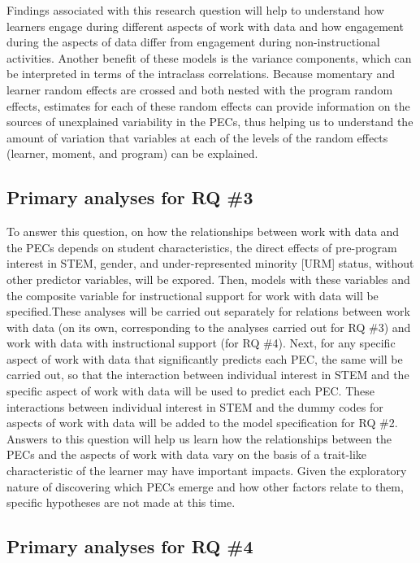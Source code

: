 \documentclass[]{msu-thesis}
\theoremstyle{definition}
\theoremstyle{definition}
\theoremstyle{definition}
\theoremstyle{remark}
\begin{document}
Findings associated with this research question will help to understand
how learners engage during different aspects of work with data and how
engagement during the aspects of data differ from engagement during
non-instructional activities. Another benefit of these models is the
variance components, which can be interpreted in terms of the intraclass
correlations. Because momentary and learner random effects are crossed
and both nested with the program random effects, estimates for each of
these random effects can provide information on the sources of
unexplained variability in the PECs, thus helping us to understand the
amount of variation that variables at each of the levels of the random
effects (learner, moment, and program) can be explained.

\subsection{Primary analyses for RQ
\#3}\label{primary-analyses-for-rq-3}

To answer this question, on how the relationships between work with data
and the PECs depends on student characteristics, the direct effects of
pre-program interest in STEM, gender, and under-represented minority
{[}URM{]} status, without other predictor variables, will be expored.
Then, models with these variables and the composite variable for
instructional support for work with data will be specified.These
analyses will be carried out separately for relations between work with
data (on its own, corresponding to the analyses carried out for RQ \#3)
and work with data with instructional support (for RQ \#4). Next, for
any specific aspect of work with data that significantly predicts each
PEC, the same will be carried out, so that the interaction between
individual interest in STEM and the specific aspect of work with data
will be used to predict each PEC. These interactions between individual
interest in STEM and the dummy codes for aspects of work with data will
be added to the model specification for RQ \#2. Answers to this question
will help us learn how the relationships between the PECs and the
aspects of work with data vary on the basis of a trait-like
characteristic of the learner may have important impacts. Given the
exploratory nature of discovering which PECs emerge and how other
factors relate to them, specific hypotheses are not made at this time.

\subsection{Primary analyses for RQ
\#4}\label{primary-analyses-for-rq-4}
\end{document}
